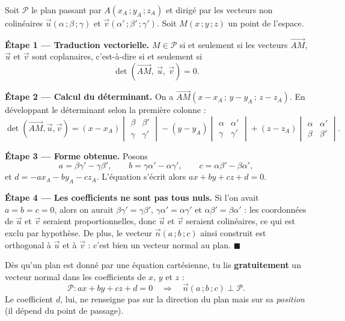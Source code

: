 \documentclass[11pt]{article}
\begin{document}
\begin{experience}
Soit $\mathcal{P}$ le plan passant par $A(x_A\,;y_A\,;z_A)$ et dirigé par les vecteurs non colinéaires $\vec{u}(\alpha\,;\beta\,;\gamma)$ et $\vec{v}(\alpha'\,;\beta'\,;\gamma')$. Soit $M(x\,;y\,;z)$ un point de l'espace.

\textbf{Étape 1 — Traduction vectorielle.} $M \in \mathcal{P}$ si et seulement si les vecteurs $\overrightarrow{AM}$, $\vec{u}$ et $\vec{v}$ sont coplanaires, c'est-à-dire si et seulement si
\[ \det\left(\overrightarrow{AM},\ \vec{u},\ \vec{v}\right) = 0. \]

\textbf{Étape 2 — Calcul du déterminant.} On a $\overrightarrow{AM}(x - x_A\,;\,y - y_A\,;\,z - z_A)$. En développant le déterminant selon la première colonne :
\[
\det\left(\overrightarrow{AM},\vec{u},\vec{v}\right)
= (x - x_A)\begin{vmatrix} \beta & \beta' \\ \gamma & \gamma' \end{vmatrix}
- (y - y_A)\begin{vmatrix} \alpha & \alpha' \\ \gamma & \gamma' \end{vmatrix}
+ (z - z_A)\begin{vmatrix} \alpha & \alpha' \\ \beta & \beta' \end{vmatrix}.
\]

\textbf{Étape 3 — Forme obtenue.} Posons
\[ a = \beta\gamma' - \gamma\beta', \qquad b = \gamma\alpha' - \alpha\gamma', \qquad c = \alpha\beta' - \beta\alpha', \]
et $d = -ax_A - by_A - cz_A$. L'équation s'écrit alors $ax + by + cz + d = 0$.

\textbf{Étape 4 — Les coefficients ne sont pas tous nuls.} Si l'on avait $a = b = c = 0$, alors on aurait $\beta\gamma' = \gamma\beta'$, $\gamma\alpha' = \alpha\gamma'$ et $\alpha\beta' = \beta\alpha'$ : les coordonnées de $\vec{u}$ et $\vec{v}$ seraient proportionnelles, donc $\vec{u}$ et $\vec{v}$ seraient colinéaires, ce qui est exclu par hypothèse. De plus, le vecteur $\vec{n}(a\,;b\,;c)$ ainsi construit est orthogonal à $\vec{u}$ et à $\vec{v}$ : c'est bien un vecteur normal au plan. $\blacksquare$
\end{experience}

\begin{aretenir}
Dès qu'un plan est donné par une équation cartésienne, tu lis \textbf{gratuitement} un vecteur normal dans les coefficients de $x$, $y$ et $z$ :
\[ \mathcal{P} : ax + by + cz + d = 0 \quad\Longrightarrow\quad \vec{n}(a\,;b\,;c) \perp \mathcal{P}. \]
Le coefficient $d$, lui, ne renseigne pas sur la direction du plan mais sur sa \emph{position} (il dépend du point de passage).
\end{aretenir}
\end{document}
